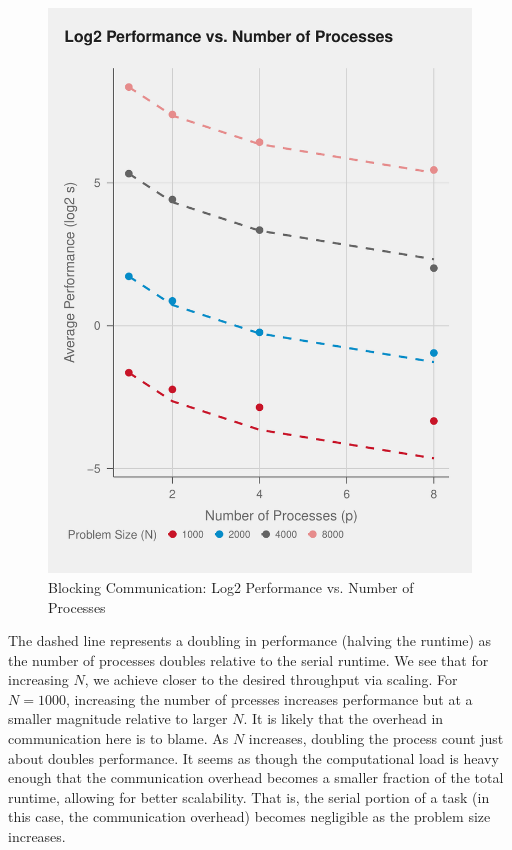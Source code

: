 \documentclass{article}
\begin{document}
\begin{figure}[H]
   \centering
   \includegraphics[scale=0.7]{../part2/out/np.pdf} 
   \caption{Blocking Communication: Log2 Performance vs. Number of Processes}
\end{figure}
\noindent The dashed line represents a doubling in performance (halving the runtime) 
as the number of processes doubles relative to the serial runtime. We see that 
for increasing $N$, we achieve closer to the desired throughput via scaling. 
For $N = 1000$, increasing the number of prcesses increases performance but at a 
smaller magnitude relative to larger $N$. It is likely that the overhead in 
communication here is to blame. As $N$ increases, doubling the process count 
just about doubles performance. It seems as though the computational load is 
heavy enough that the communication overhead becomes a smaller fraction of 
the total runtime, allowing for better scalability. That is, the serial portion of a task 
(in this case, the communication overhead) becomes negligible as the problem size increases.
\end{document}
